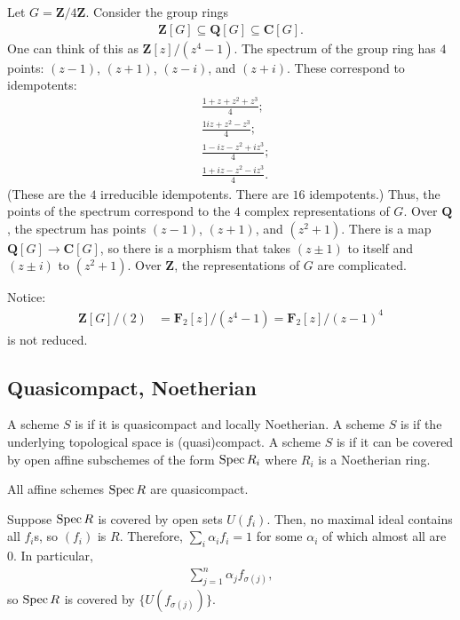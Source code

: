 \documentclass [11 pt, oneside] {article}
\begin{document}
\begin{example}[ ]\label{}\text{}
Let $G=\mathbf{Z}/4\mathbf{Z}$. Consider the group rings
\begin{align*}
	\mathbf{Z}[G] \subseteq \mathbf{Q}[G] \subseteq \mathbf{C}[G].
\end{align*}
One can think of this as $\mathbf{Z}[z]/(z^4-1)$. The spectrum of the group ring has $4$ points: $(z-1)$, $(z+1)$, $(z-i)$, and $(z+i)$. These correspond to idempotents:
\begin{align*}
	&\frac{1+z+z^2+z^3}{4};\\
	&\frac{1iz+z^2-z^3}{4};\\
	&\frac{1 -iz-z^2 + iz^3}{4};\\
	&\frac{1+iz-z^2-iz^3}{4}.
\end{align*}
(These are the $4$ irreducible idempotents. There are $16$ idempotents.) Thus, the points of the spectrum correspond to the $4$ complex representations of $G$. Over $\mathbf{Q}$, the spectrum has points $(z-1)$, $(z+1)$, and $(z^2+1)$. There is a map $\mathbf{Q}[G] \longrightarrow \mathbf{C}[G]$, so there is a morphism that takes $(z\pm1)$ to itself and $(z\pm i)$ to $(z^2+1)$. Over $\mathbf{Z}$, the representations of $G$ are complicated.
\end{example}

\begin{remark}
	Notice:
	\begin{align*}
		\mathbf{Z}[G] / (2) &=  \mathbf{F}_{2}[z]/(z^4-1) =  \mathbf{F}_{2}[z] /(z-1)^4
	\end{align*}
	is not reduced.
\end{remark}

\subsection{Quasicompact, Noetherian}
A scheme $S$ is  if it is quasicompact and locally Noetherian. A scheme $S$ is  if the underlying topological space is (quasi)compact. A scheme $S$ is  if it can be covered by open affine subschemes of the form $\operatorname{Spec} R_i$ where $R_i$ is a Noetherian ring.

\begin{remark}
	All affine schemes $\operatorname{Spec} R$ are quasicompact.
\end{remark}

Suppose $\operatorname{Spec} R$ is covered by open sets $U({f_i})$. Then, no maximal ideal contains all $f_i$s, so $(f_i)$ is $R$. Therefore, $\sum_{i}^{} \alpha_if_i=1$ for some $\alpha_i$ of which almost all are $0$. In particular,
\begin{align*}
	\sum_{j=1}^{n} \alpha_{j}f_{\sigma(j) },
\end{align*}
so $\operatorname{Spec} R$ is covered by $\{U({f_{\sigma(j)}})\}$.
\end{document}
